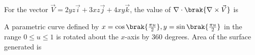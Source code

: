 \iffalse
\title{2017-ME-27-39}
\author{EE24BTECH11001 -  ADITYA TRIPATHY}
\section{me}
\chapter{2017}
\fi

    \item 
        For the vector $\vec{V} = 2yz\vec{i} + 3xz\vec{j} + 4xy\vec{k}$, the value of 
        $\nabla \cdot \brak{\nabla \times \vec{V}}$ is 
        \hfill{}
\\
    \item A parametric curve defined by $x = \cos\brak{\frac{\pi u}{2}}, y = \sin\brak{\frac{\pi u}{2}}$ 
        in the range $0 \le u \le 1$ is rotated about the $x$-axis by 360 degrees. Area of the surface 
        generated is


